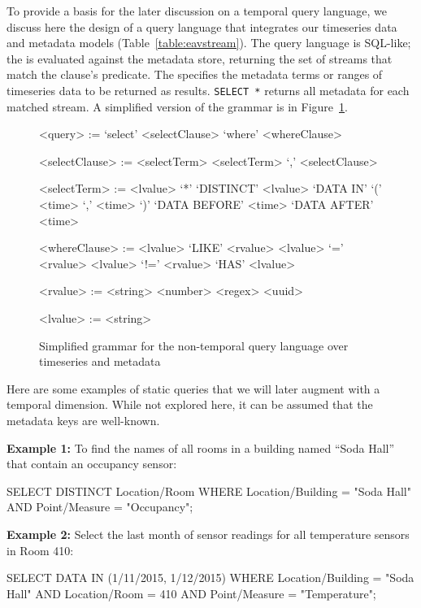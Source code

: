 To provide a basis for the later discussion on a temporal query language, we
discuss here the design of a query language that integrates our timeseries data
and metadata models (Table~\ref{table:eavstream}).  The query language is
SQL-like; the  is evaluated against the metadata store,
returning the set of streams that match the clause's predicate. The
 specifies the metadata terms or ranges of timeseries data
to be returned as results. \texttt{SELECT *} returns all metadata for each
matched stream.  A simplified version of the grammar is in
Figure~\ref{fig:nontemporalgrammar}.

\setlength{\grammarindent}{8em}
\setlength{\grammarparsep}{4pt}
\begin{figure}
\centering
\begin{grammar}
<query> := `select' <selectClause> `where' <whereClause>

<selectClause> := <selectTerm>
\alt <selectTerm> `,' <selectClause>

<selectTerm> := <lvalue>
\alt `*'
\alt `DISTINCT' <lvalue>
\alt `DATA IN' `(' <time> `,' <time> `)'
\alt `DATA BEFORE' <time>
\alt `DATA AFTER' <time>

<whereClause> := <lvalue> `LIKE' <rvalue>
\alt <lvalue> `=' <rvalue>
\alt <lvalue> `!=' <rvalue>
\alt `HAS' <lvalue>

<rvalue> := <string>
\alt <number>
\alt <regex>
\alt <uuid>

<lvalue> := <string>
\end{grammar}
\caption{Simplified grammar for the non-temporal query language over timeseries and metadata}
\label{fig:nontemporalgrammar}
\end{figure}

Here are some examples of static queries that we will later augment with a temporal dimension.
While not explored here, it can be assumed that the metadata keys are well-known.

\textbf{Example 1:}
To find the names of all rooms in a building named ``Soda Hall'' that contain an occupancy sensor:

\begin{sqlcode}
SELECT DISTINCT Location/Room WHERE
Location/Building = "Soda Hall" AND
Point/Measure = "Occupancy";
\end{sqlcode}

\textbf{Example 2:}
Select the last month of sensor readings for all temperature sensors in Room 410:

\begin{sqlcode}
SELECT DATA IN (1/11/2015, 1/12/2015) WHERE
Location/Building = "Soda Hall" AND
Location/Room = 410 AND
Point/Measure = "Temperature";
\end{sqlcode}

